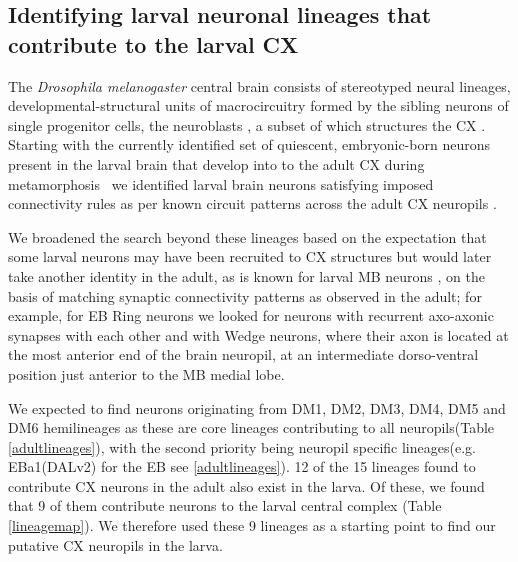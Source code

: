 \subsection{Identifying larval neuronal lineages that contribute to the larval CX}
The \textit{Drosophila melanogaster} central brain consists of stereotyped neural lineages, developmental-structural units of macrocircuitry formed by the sibling neurons of single progenitor cells, the neuroblasts \citep{Spindler2010Lineages}, a subset of which structures the CX \citep{Pereanu2011LineagesCX}.
Starting with the currently identified set of quiescent, embryonic-born neurons present in the larval brain that develop into to the adult CX during metamorphosis~\citep{andrade2019developmentally}
we identified larval brain neurons satisfying imposed connectivity rules as per known circuit patterns across the adult CX neuropils \citep{wolff2015neuroarchitecture, wolff2018neuroarchitecture, franconville2018building, hulse2021connectome}.

We broadened the search beyond these lineages based on the expectation that some larval neurons may have been recruited to CX structures but would later take another identity in the adult, as is known for larval MB neurons \citep{truman2023metamorphosis}, on the basis of matching synaptic connectivity patterns as observed in the adult; for example, for EB Ring neurons we looked for neurons with recurrent axo-axonic synapses with each other and with Wedge neurons, where their axon is located at the most anterior end of the brain neuropil, at an intermediate dorso-ventral position just anterior to the MB medial lobe.


We expected to find neurons originating from DM1, DM2, DM3, DM4, DM5 and DM6 hemilineages as these are core lineages contributing to all neuropils(Table \ref{adultlineages}), with the second priority being neuropil specific lineages(e.g. EBa1(DALv2) for the EB see \ref{adultlineages}). 12 of the 15 lineages found to contribute CX neurons in the adult also exist in the larva. Of these, we found that 9 of them contribute neurons to the larval central complex (Table \ref{lineagemap}). We therefore used these 9 lineages as a starting point to find our putative CX neuropils in the larva.


